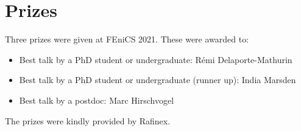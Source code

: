 \section*{Prizes}

Three prizes were given at FEniCS 2021. These were awarded to:
\begin{itemize}
\item Best talk by a PhD student or undergraduate: Rémi Delaporte-Mathurin
\item Best talk by a PhD student or undergraduate (runner up): India Marsden
\item Best talk by a postdoc: Marc Hirschvogel
\end{itemize}

\noindent The prizes were kindly provided by Rafinex.
